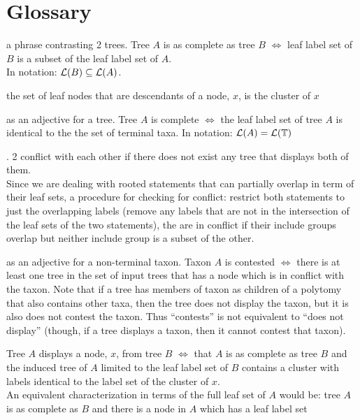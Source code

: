\newcommand{\defitem}[2]{\item[{\bf #1}]\label{itm:#2} }
\newcommand{\notitem}[1]{\item[]#1}
\section{Glossary}
\begin{compactenum}
\defitem{as complete}{defAsComplete} a phrase contrasting 2 trees.
    Tree $A$ is as complete as tree $B$ $\iff$
    leaf label set of $B$ is a subset of the leaf label set of $A$.\\
    In notation: $\mathcal{L}(B) \subseteq \mathcal{L}(A)$.
\defitem{cluster}{defCluster} the set of leaf nodes that are descendants
    of a node, $x$, is the cluster of $x$
\defitem{complete}{defComplete} as an adjective for a tree. Tree $A$ is complete $\iff$ the leaf label set
    of tree $A$ is identical to the the set of terminal taxa.
    In notation: $\mathcal{L}(A) = \mathcal{L}(\mathbb{T})$
\defitem{conflicting}{defConflicting}. 2 \pss conflict with each other if there does not exist
    any tree that displays both of them.\\
    Since we are dealing with rooted statements that can partially overlap in term of their leaf sets, 
    a procedure for checking for conflict: restrict both statements to just the overlapping labels 
    (remove any labels that are not in the intersection of the leaf sets of the two statements), the
    \pss are in conflict if their include groups overlap but neither include group is a subset of the
    other.
\defitem{contested}{defContested} as an adjective for a non-terminal taxon. Taxon $A$ is contested $\iff$ 
    there is at least one tree in the set of input trees that has a node which is in conflict
    with the taxon.
    Note that if a tree has members of taxon as children of a polytomy that also contains other taxa, then
        the tree does not display the taxon, but it is also does not contest the taxon.
    Thus ``contests'' is not equivalent to ``does not display'' (though, if a tree displays a taxon, then 
        it cannot contest that taxon).
\defitem{display}{defDisplay} Tree $A$ displays a node, $x$, from tree $B$ $\iff$
    that $A$ is as complete as tree $B$ and the induced tree of $A$ limited to the 
    leaf label set of $B$ contains a cluster with labels identical to the label set of the cluster of $x$.\\
    An equivalent characterization in terms of the full leaf set of $A$ would be:
    tree $A$ is as complete as $B$ and there is a node in $A$ which has a leaf label set 

\end{compactenum}
